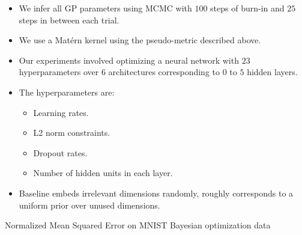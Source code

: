 \documentclass[landscape,a0b,final,a4resizeable]{include/a0poster}
\begin{document}
\begin{poster}
\begin{multicols}{3}
	\begin{itemize}
		\item We infer all GP parameters using MCMC with $100$ steps of burn-in and $25$ steps in between each trial.
		\item We use a Mat\'{e}rn kernel using the pseudo-metric described above.
		\item Our experiments involved optimizing a neural network with $23$ hyperparameters over $6$ architectures corresponding to $0$ to $5$ hidden layers.
		\item The hyperparameters are:
		\begin{itemize}
			\item Learning rates.
			\item L2 norm constraints.
			\item Dropout rates.
			\item Number of hidden units in each layer.
		\end{itemize}
		\item Baseline embeds irrelevant dimensions randomly, roughly corresponds to a uniform prior over unused dimensions.
	\end{itemize}




\newpage





\begin{minipage}[c]{0.95\columnwidth}


Normalized Mean Squared Error on MNIST Bayesian optimization data
%
\end{minipage}





\end{multicols}
\end{poster}
\end{document}
